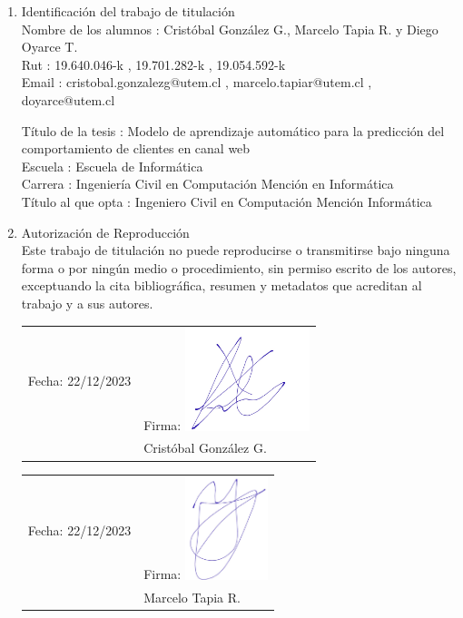 \begin{enumerate}
    \item Identificación del trabajo de titulación \\
    Nombre de los alumnos
    :   Cristóbal González G., Marcelo Tapia R. y Diego Oyarce T. \\
    Rut
    : 19.640.046-k , 19.701.282-k , 19.054.592-k \\
    Email
    : cristobal.gonzalezg@utem.cl , marcelo.tapiar@utem.cl , doyarce@utem.cl

    \vspace{0.1cm}

    Título de la tesis
    : Modelo de aprendizaje automático para la predicción del comportamiento de clientes en canal web \\
    Escuela
    : Escuela de Informática \\
    Carrera
    : Ingeniería Civil en Computación Mención en Informática \\
    Título al que opta
    : Ingeniero Civil en Computación Mención Informática \\
    \item Autorización de Reproducción \\
    Este trabajo de titulación no puede reproducirse o transmitirse bajo ninguna forma o por ningún medio o procedimiento, sin permiso escrito de los autores, exceptuando la cita bibliográfica, resumen y metadatos que acreditan al trabajo y a sus autores. \\

    \vspace{3cm}

    \begin{tabular}{@{}l l}
        Fecha: 22/12/2023 \hspace{3cm} & Firma: \includegraphics[height=3cm]{img/firma_Cris_tt.jpeg} \\
        & Cristóbal González G.
    \end{tabular}

    \vspace{1cm}

    \begin{tabular}{@{}l l}
        Fecha: 22/12/2023 \hspace{3cm} & Firma:  \includegraphics[height=3cm]{img/Firma Marcelo Tapia.jpg} \\
        & Marcelo Tapia R.
    \end{tabular}


\end{enumerate}
